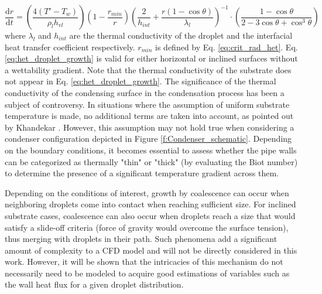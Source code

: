 \documentclass[12pt]{article}
\numberwithin{equation}{section}
\begin{document}
\begin{equation}\label{eq:het_droplet_growth}
        \frac{\mathrm{d}r}{\mathrm{d}t}= \left(\frac{4(T'-T_{w})}{\rho_{l}h_{vl}}\right)(1-\frac{r_{min}}{r})\left(\frac{2}{h_{int}}+\frac{r(1-\cos\theta)}{\lambda_{l}}\right)^{-1}  \cdot\left(\frac{1-\cos\theta}{2-3\cos\theta+\cos^{3}\theta}\right)
\end{equation}
where $\lambda_{l}$ and $h_{int}$ are the thermal conductivity of the droplet and the interfacial heat transfer coefficient respectively. $r_{min}$ is defined by Eq. \ref{eq:crit_rad_het}. Eq. \ref{eq:het_droplet_growth} is valid for either horizontal or inclined surfaces without a wettability gradient. Note that the thermal conductivity of the substrate does not appear in Eq. \ref{eq:het_droplet_growth}. The significance of the thermal conductivity of the condensing surface in the condensation process has been a subject of controversy. In situations where the assumption of uniform substrate temperature is made, no additional terms are taken into account, as pointed out by Khandekar \cite{khandekar2020drop}. However, this assumption may not hold true when considering a condenser configuration depicted in Figure \ref{f:Condenser_schematic}. Depending on the boundary conditions, it becomes essential to assess whether the pipe walls can be categorized as thermally "thin" or "thick" (by evaluating the Biot number) to determine the presence of a significant temperature gradient across them. 

Depending on the conditions of interest, growth by coalescence can occur when neighboring droplets come into contact when reaching sufficient size. For inclined substrate cases, coalescence can also occur when droplets reach a size that would satisfy a slide-off criteria (force of gravity would overcome the surface tension), thus merging with droplets in their path. Such phenomena add a significant amount of complexity to a CFD model and will not be directly considered in this work. However, it will be shown that the intricacies of this mechanism do not necessarily need to be modeled to acquire good estimations of variables such as the wall heat flux for a given droplet distribution. 
\end{document}
